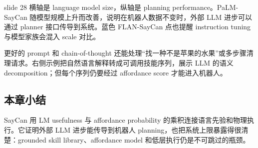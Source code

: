 slide 28 横轴是 language model size，纵轴是 planning performance。PaLM-SayCan 随模型规模上升而改善，说明在机器人数据不变时，外部 LLM 进步可以通过 planner 接口传导到系统。蓝色 FLAN-SayCan 点也提醒 instruction tuning 与模型家族会混入 scale 对比。


更好的 prompt 和 chain-of-thought 还能处理“找一种不是苹果的水果”或多步骤清理请求。右侧示例把自然语言解释转成可调用技能序列，展示 LLM 的语义 decomposition；但每个序列仍要经过 affordance score 才能进入机器人。



\subsection{本章小结}

SayCan 用 LM usefulness 与 affordance probability 的乘积连接语言先验和物理执行。它证明外部 LLM 进步能传导到机器人 planning，也把系统上限暴露得很清楚：grounded skill library、affordance model 和低层执行仍是不可跳过的瓶颈。

